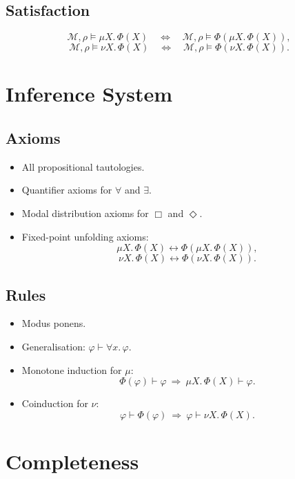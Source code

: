\subsection{Satisfaction}

\[
\mathcal{M},\rho\models\mu X.\,\Phi(X)
\quad\Longleftrightarrow\quad
\mathcal{M},\rho\models\Phi(\mu X.\,\Phi(X)),
\]
\[
\mathcal{M},\rho\models\nu X.\,\Phi(X)
\quad\Longleftrightarrow\quad
\mathcal{M},\rho\models\Phi(\nu X.\,\Phi(X)).
\]

\section{Inference System}

\subsection{Axioms}

\begin{itemize}
\item All propositional tautologies.
\item Quantifier axioms for $\forall$ and $\exists$.
\item Modal distribution axioms for $\Box$ and $\Diamond$.
\item Fixed-point unfolding axioms:
\[
\mu X.\,\Phi(X) \leftrightarrow \Phi(\mu X.\,\Phi(X)),
\]
\[
\nu X.\,\Phi(X) \leftrightarrow \Phi(\nu X.\,\Phi(X)).
\]
\end{itemize}

\subsection{Rules}

\begin{itemize}
\item Modus ponens.
\item Generalisation:  
  $\varphi \vdash \forall x.\,\varphi$.
\item Monotone induction for $\mu$:
  \[
  \Phi(\varphi) \vdash \varphi
  \ \Longrightarrow\
  \mu X.\,\Phi(X) \vdash \varphi.
  \]
\item Coinduction for $\nu$:
  \[
  \varphi \vdash \Phi(\varphi)
  \ \Longrightarrow\
  \varphi \vdash \nu X.\,\Phi(X).
  \]
\end{itemize}

\section{Completeness}

